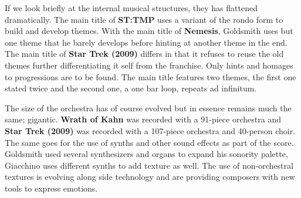 If we look briefly at the internal musical structures, they has flattened dramatically. The main title of \textbf{ST:TMP} uses a variant of the rondo form to build and develop themes. With the main title of \textbf{Nemesis}, Goldsmith uses but one theme that he barely develops before hinting at another theme in the end. The main title of \textbf{Star Trek (2009)} differs in that it refuses to reuse the old themes further differentiating it self from the franchise. Only hints and homages to progressions are to be found. The main title features two themes, the first one stated twice and the second one, a one bar loop, repeats ad infinitum. 

The size of the orchestra has of course evolved but in essence remains much the same; gigantic. \textbf{Wrath of Kahn} was recorded with a 91-piece orchestra and \textbf{Star Trek (2009)} was recorded with a 107-piece orchestra and 40-person choir. The same goes for the use of synths and other sound effects as part of the score. Goldsmith used several synthesizers and organs to expand his sonority palette, Giacchino uses different synths to add texture as well. The use of non-orchestral textures is evolving along side technology and are providing composers with new tools to express emotions. 
